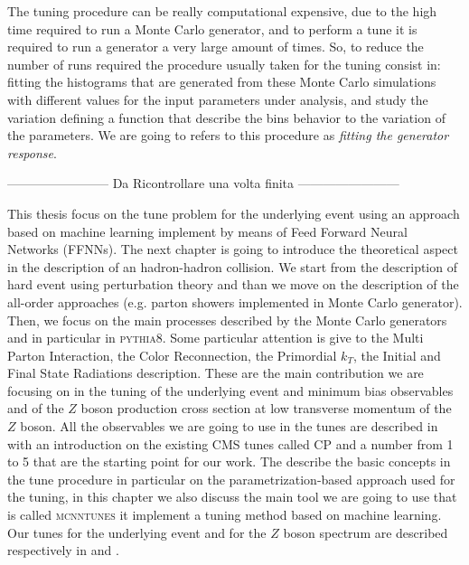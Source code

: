 The tuning procedure can be really computational expensive, due to the high time required to run a Monte Carlo generator, and to perform a tune it is required to run a generator a very large amount of times. So, to reduce the number of runs required the procedure usually taken for the tuning consist in: fitting the histograms that are generated from these Monte Carlo simulations with different values for the input parameters under analysis, and study the variation defining a function that describe the bins behavior to the variation of the parameters. We are going to refers to this procedure as \textit{fitting the generator response}.


------------------------ Da Ricontrollare una volta finita ------------------------

This thesis focus on the tune problem for the underlying event using an approach based on machine learning implement by means of Feed Forward Neural Networks (FFNNs). 
The next chapter is going to introduce the theoretical aspect in the description of an hadron-hadron collision. We start from the description of hard event using perturbation theory and than we move on the description of the all-order approaches (e.g. parton showers implemented in Monte Carlo generator). Then, we focus on the main processes described by the Monte Carlo generators and in particular in \textsc{pythia8}. Some particular attention is give to the Multi Parton Interaction, the Color Reconnection, the Primordial $k_T$, the Initial and Final State Radiations description. These are the main contribution we are focusing on in the tuning of the underlying event and minimum bias observables and of the $Z$ boson production cross section at low transverse momentum of the $Z$ boson. All the observables we are going to use in the tunes are described in  with an introduction on the existing CMS tunes called CP and a number from 1 to 5 that are the starting point for our work. The  describe the basic concepts in the tune procedure in particular on the parametrization-based approach used for the tuning, in this chapter we also discuss the main tool we are going to use that is called \textsc{mcnntunes} it implement a tuning method based on machine learning. Our tunes for the underlying event and for the $Z$ boson spectrum are described respectively in  and .
 